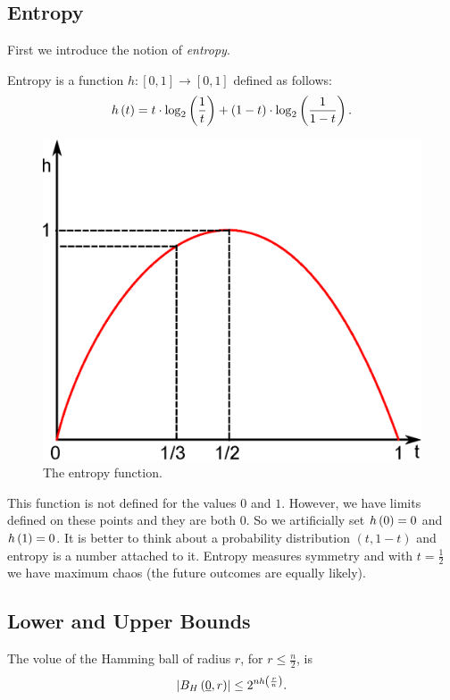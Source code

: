 \subsection{Entropy}
First we introduce the notion of \emph{entropy}.

\begin{definition}[Entropy]
Entropy is a function $h: [0, 1] \rightarrow [0, 1]$ defined as follows:
\begin{equation}
	h\left({t}\right) =
	t \cdot \log_2 \left( \frac{1}{t} \right)
	+
	(1 - t) \cdot \log_2 \left( \frac{1}{1-t} \right).
\end{equation} 
\end{definition}

\begin{figure}[h!]
	\centering
	\includegraphics[width=0.5\linewidth]{pictures/ch01-i00.eps}
	\caption{The entropy function.}
\end{figure}

This function is not defined for the values $0$ and $1$.
However, we have limits defined on these points and they are both $0$.
So we artificially set $h\left({0}\right) = 0$ and $h\left({1}\right) = 0$.
It is better to think about a probability distribution $(t, 1 - t)$ and entropy is a number attached to it.
Entropy measures symmetry and with $t = \frac{1}{2}$ we have maximum chaos (the future outcomes are equally likely).

\subsection{Lower and Upper Bounds}

\begin{thm}
	The volue of the Hamming ball of radius $r$, for $r \leq \frac{n}{2}$, is
	\begin{equation*}
		\left|{B_H\left(\underline{0}, r\right)}\right| \leq 2^{nh\left(\frac{r}{n}\right)}.
	\end{equation*}
\end{thm}

